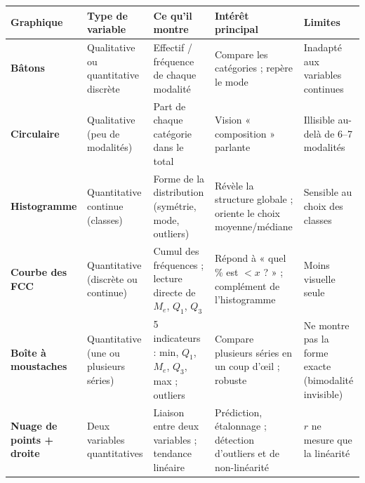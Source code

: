\documentclass[11pt,a4paper]{article}
\begin{document}
\begin{tcolorbox}[enhanced, colback=corrigelight, colframe=corrige,
                  title={\faChartBar\ \ \textbf{Tableau comparatif des graphiques}},
                  coltitle=white, fonttitle=\bfseries\large,
                  boxrule=0.8pt, arc=4pt, left=8pt, right=8pt, top=8pt, bottom=8pt,
                  drop fuzzy shadow=black!15]
\small
\renewcommand{\arraystretch}{1.4}
\begin{tabular}{|p{2.3cm}|p{2.6cm}|p{2.9cm}|p{3.3cm}|p{2.5cm}|}
\hline
\rowcolor{corrige!25}
\textbf{Graphique} & \textbf{Type de variable} & \textbf{Ce qu'il montre} & \textbf{Intérêt principal} & \textbf{Limites} \\
\hline
\textbf{Bâtons} & Qualitative ou quantitative discrète & Effectif / fréquence de chaque modalité & Compare les catégories ; repère le mode & Inadapté aux variables continues \\
\hline
\textbf{Circulaire} & Qualitative (peu de modalités) & Part de chaque catégorie dans le total & Vision « composition » parlante & Illisible au-delà de 6--7 modalités \\
\hline
\textbf{Histogramme} & Quantitative continue (classes) & Forme de la distribution (symétrie, mode, outliers) & Révèle la structure globale ; oriente le choix moyenne/médiane & Sensible au choix des classes \\
\hline
\textbf{Courbe des FCC} & Quantitative (discrète ou continue) & Cumul des fréquences ; lecture directe de $M_e$, $Q_1$, $Q_3$ & Répond à « quel \% est $< x$ ? » ; complément de l'histogramme & Moins visuelle seule \\
\hline
\textbf{Boîte à moustaches} & Quantitative (une ou plusieurs séries) & 5 indicateurs : min, $Q_1$, $M_e$, $Q_3$, max ; outliers & Compare plusieurs séries en un coup d'œil ; robuste & Ne montre pas la forme exacte (bimodalité invisible) \\
\hline
\textbf{Nuage de points + droite} & Deux variables quantitatives & Liaison entre deux variables ; tendance linéaire & Prédiction, étalonnage ; détection d'outliers et de non-linéarité & $r$ ne mesure que la linéarité \\
\hline
\end{tabular}
\end{tcolorbox}

\vspace{0.3cm}
\end{document}
